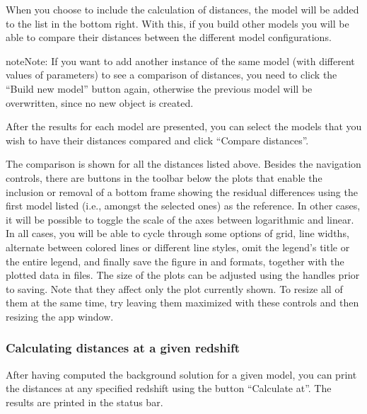 \documentclass[letterpaper,12pt,english]{sphinxhowto}
\begin{document}
When you choose to include the calculation of distances, the model will be
added to the list in the bottom right.
With this, if you build other models you will be able to compare their distances
between the different model configurations.

\begin{sphinxadmonition}{note}{Note:}
If you want to add another instance of the same model (with different values of parameters) to see a comparison of distances, you need to click the “Build new model” button again, otherwise the previous model will be overwritten, since no new  object is created.
\end{sphinxadmonition}

After the results for each model are presented, you can select the models that
you wish to have their distances compared and click “Compare distances”.

\noindent{}

The comparison is shown for all the distances listed above.
Besides the navigation controls, there are buttons in the toolbar below
the plots that enable the inclusion or removal of a bottom frame showing the
residual differences using the first model listed (i.e., amongst the selected
ones) as the reference.
In other cases, it will be possible to toggle the scale of the axes between
logarithmic and linear.
In all cases, you will be able to cycle through some options of grid, line
widths, alternate between colored lines or different line styles, omit the
legend’s title or the entire legend, and finally save the figure in  and
 formats, together with the plotted data in  files.
The size of the plots can be adjusted using the handles prior to saving.
Note that they affect only the plot currently shown.
To resize all of them at the same time, try leaving them maximized with these
controls and then resizing the app window.


\subsubsection{Calculating distances at a given redshift}
\label{\detokenize{calculator_gui:calculating-distances-at-a-given-redshift}}
After having computed the background solution for a given model, you can print
the distances at any specified redshift using the button “Calculate at”.
The results are printed in the status bar.
\end{document}
